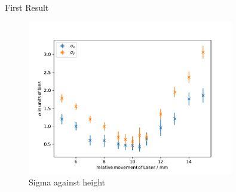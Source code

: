 \begin{frame}{ First Result }

     \begin{figure}
       \centering
       \includegraphics[width=0.8\textwidth]{./perfect_height.pdf}
       \caption{ Sigma against height }
       \label{ fig: iv_curve_theoretical}
     \end{figure}

\end{frame}



